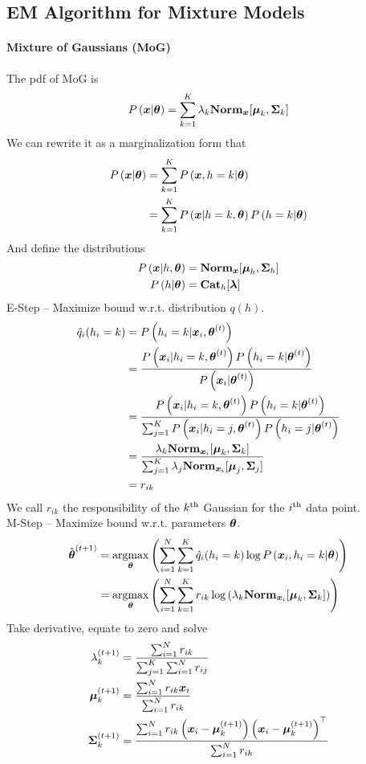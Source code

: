 \subsection{EM Algorithm for Mixture Models}

\paragraph{Mixture of Gaussians (MoG)}

The pdf of MoG is
\begin{align*}
	P\left(\boldsymbol{x}|\boldsymbol{\theta}\right)=\sum_{k=1}^K\lambda_k\mathbf{Norm}_{\boldsymbol{x}}[\boldsymbol{\mu}_k,\mathbf{\Sigma}_k]
\end{align*}
We can rewrite it as a marginalization form that
\begin{align*}
	P\left(\boldsymbol{x}|\boldsymbol{\theta}\right)&=\sum_{k=1}^KP\left(\boldsymbol{x},h=k|\boldsymbol{\theta}\right) \\
	&=\sum_{k=1}^KP\left(\boldsymbol{x}|h=k,\boldsymbol{\theta}\right)P\left(h=k|\boldsymbol{\theta}\right)
\end{align*}
And define the distributions
\begin{align*}
	P\left(\boldsymbol{x}|h,\boldsymbol{\theta}\right)&=\mathbf{Norm}_{\boldsymbol{x}}[\boldsymbol{\mu}_h,\mathbf{\Sigma}_h] \\
	P\left(h|\boldsymbol{\theta}\right)&=\mathbf{Cat}_h[\boldsymbol{\lambda}]
\end{align*}
E-Step -- Maximize bound w.r.t. distribution $q(h)$.
\begin{align*}
	\hat{q}_i(h_i=k)&=P\left(h_i=k|\boldsymbol{x}_i,\boldsymbol{\theta}^{(t)}\right) \\
	&=\frac{P\left(\boldsymbol{x}_i|h_i=k,\boldsymbol{\theta}^{(t)}\right)P\left(h_i=k|\boldsymbol{\theta}^{(t)}\right)}{P\left(\boldsymbol{x}_i|\boldsymbol{\theta}^{(t)}\right)} \\
	&=\frac{P\left(\boldsymbol{x}_i|h_i=k,\boldsymbol{\theta}^{(t)}\right)P\left(h_i=k|\boldsymbol{\theta}^{(t)}\right)}{\sum_{j=1}^KP\left(\boldsymbol{x}_i|h_i=j,\boldsymbol{\theta}^{(t)}\right)P\left(h_i=j|\boldsymbol{\theta}^{(t)}\right)} \\
	&=\frac{\lambda_k\mathbf{Norm}_{\boldsymbol{x}_i}[\boldsymbol{\mu}_k,\mathbf{\Sigma}_k]}{\sum_{j=1}^K\lambda_j\mathbf{Norm}_{\boldsymbol{x}_i}[\boldsymbol{\mu}_j,\mathbf{\Sigma}_j]} \\
	&=r_{ik}
\end{align*}
We call $r_{ik}$ the responsibility of the $k^\text{th}$ Gaussian for the $i^\text{th}$ data point. \\
M-Step -- Maximize bound w.r.t. parameters $\boldsymbol{\theta}$.
\begin{align*}
	\hat{\vec{\th}}^{(t+1)}&=\argmax_{\vec{\th}}\left(\sum_{i=1}^N\sum_{k=1}^K\hat{q}_i(h_i=k)\log\P{\vec{x}_i,h_i=k|\vec{\th}}\right) \\
	&=\argmax_{\vec{\th}}\left(\sum_{i=1}^N\sum_{k=1}^Kr_{ik}\log\left(\la_k\Norm_{\vec{x}_i}[\vec{\mu}_k,\mat{\Si}_k]\right)\right)
\end{align*}
Take derivative, equate to zero and solve
\begin{align*}
	\lambda_k^{(t+1)}&=\frac{\sum_{i=1}^Nr_{ik}}{\sum_{j=1}^K\sum_{i=1}^Nr_{ij}} \\
	\boldsymbol{\mu}_k^{(t+1)}&=\frac{\sum_{i=1}^Nr_{ik}\boldsymbol{x}_i}{\sum_{i=1}^Nr_{ik}} \\
	\mathbf{\Sigma}_k^{(t+1)}&=\frac{\sum_{i=1}^Nr_{ik}\left(\boldsymbol{x}_i-\boldsymbol{\mu}_k^{(t+1)}\right)\left(\boldsymbol{x}_i-\boldsymbol{\mu}_k^{(t+1)}\right)^\top}{\sum_{i=1}^Nr_{ik}}
\end{align*}


